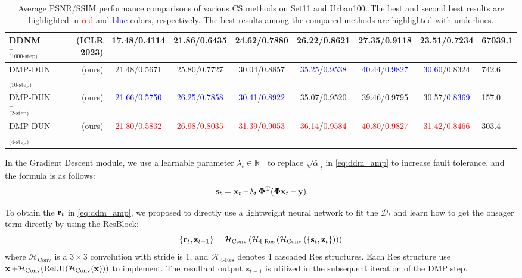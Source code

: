 \documentclass[10pt,twocolumn,letterpaper]{article}
\begin{document}
\begin{table}[th]
\begin{adjustbox}{width=\linewidth,center}
\begin{tabular}{@{}lrccccccl@{}}
			DDNM$^+_\text{(1000-step)}$\cite{wang2022zero} & (ICLR 2023) & 17.48/0.4114 & 21.86/0.6435 & 24.62/0.7880 & 26.22/0.8621 & 27.35/0.9118 & 23.51/0.7234  & 67039.1 \\ \midrule
			DMP-DUN$_\text{(10-step)}$ & (ours) & 21.48/0.5671 & 25.80/0.7727 & 30.04/0.8857 & \textcolor{blue}{35.25}/\textcolor{blue}{0.9538} & \textcolor{blue}{40.44}/\textcolor{blue}{0.9827} & \textcolor{blue}{30.60}/0.8324 & 742.6 \\
			DMP-DUN$^+_\text{(2-step)}$ & (ours) & \textcolor{blue}{21.66}/\textcolor{blue}{0.5750} & \textcolor{blue}{26.25}/\textcolor{blue}{0.7858} & \textcolor{blue}{30.41}/\textcolor{blue}{0.8922} & 35.07/0.9520 & 39.46/0.9795 & 30.57/\textcolor{blue}{0.8369} & 157.0 \\
			DMP-DUN$^+_\text{(4-step)}$ & (ours) & \textcolor{red}{21.80}/\textcolor{red}{0.5832} & \textcolor{red}{26.98}/\textcolor{red}{0.8035} & \textcolor{red}{31.39}/\textcolor{red}{0.9053} & \textcolor{red}{36.14}/\textcolor{red}{0.9584} & \textcolor{red}{40.80}/\textcolor{red}{0.9827} & \textcolor{red}{31.42}/\textcolor{red}{0.8466} & 303.4 \\ \bottomrule
		\end{tabular}
	\end{adjustbox}
	\caption{Average PSNR/SSIM performance comparisons of various CS methods on Set11\cite{kulkarni2016reconnet} and Urban100\cite{Dong2018DenoisingPD}. The best and second best results are highlighted in \textcolor{red}{red} and \textcolor{blue}{blue} colors, respectively. The best results among the compared methods are highlighted with \underline{underlines}. }
	\label{table:main_ex_urban100}
\end{table}

In the Gradient Descent module, we use a learnable parameter $\lambda_t\in\mathbb{R}^+$ to replace $\sqrt{\bar{\alpha}}_t$ in \cref{eq:ddm_amp} to increase fault tolerance, and the formula is as follows:
\begin{equation}
	\operatorname{\mathbf{s}}_t = \operatorname{\mathbf{x}}_t - \lambda_t \operatorname{\mathbf{\Phi}}^\mathrm{T}(\operatorname{\mathbf{\Phi x}}_t - \operatorname{\mathbf{y}})
\end{equation}

To obtain the $\operatorname{\mathbf{r}}_t$ in \cref{eq:ddm_amp}, we proposed to directly use a lightweight neural network to fit the $\mathcal{D}_t$ and learn how to get the onsager term directly by using the ResBlock: 
\begin{equation}
		\{ \operatorname{\mathbf{r}}_t, \operatorname{\mathbf{z}}_{t-1} \} =\mathcal{H}_\text{Conv} \left( \mathcal{H}_\text{4-Res} \left( \mathcal{H}_\text{Conv} \left( \{ \operatorname{\mathbf{s}}_t, \operatorname{\mathbf{z}}_t \} \right) \right) \right)
\end{equation}
where $\mathcal{H}_\text{Conv}$ is a $3\times 3$ convolution with stride is 1, and $\mathcal{H}_\text{4-Res}$ denotes 4 cascaded Res structures. Each Res structure use $\operatorname{\mathbf{x}} + \mathcal{H}_\text{Conv} (\text{ReLU}(\mathcal{H}_\text{Conv}(\operatorname{\mathbf{x}}))) $ to implement. The resultant output $\mathbf{z}_{t-1}$ is utilized in the subsequent iteration of the DMP step.
\end{document}
